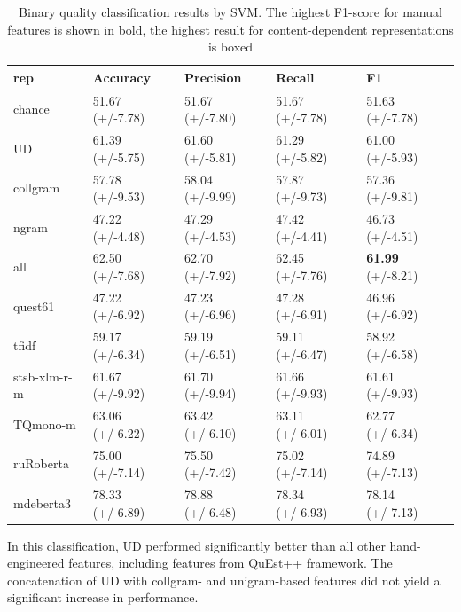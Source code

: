 \begin{table}[H]
	\centering
	\begin{tabular}{l|llll}
		\toprule
		rep      & Accuracy         & Precision        & Recall           & F1               \\
		\midrule
		chance          & 51.67 (+/-7.78) & 51.67 (+/-7.80) & 51.67 (+/-7.78) & 51.63 (+/-7.78) \\
		\midrule
		UD              & 61.39 (+/-5.75) & 61.60 (+/-5.81) & 61.29 (+/-5.82) & 61.00 (+/-5.93) \\
		collgram        & 57.78 (+/-9.53) & 58.04 (+/-9.99) & 57.87 (+/-9.73) & 57.36 (+/-9.81) \\
		ngram           & 47.22 (+/-4.48) & 47.29 (+/-4.53) & 47.42 (+/-4.41) & 46.73 (+/-4.51) \\
		all             & 62.50 (+/-7.68) & 62.70 (+/-7.92) & 62.45 (+/-7.76) & \textbf{61.99} (+/-8.21) \\
		quest61         & 47.22 (+/-6.92) & 47.23 (+/-6.96) & 47.28 (+/-6.91) & 46.96 (+/-6.92) \\
		\midrule
		tfidf           & 59.17 (+/-6.34) & 59.19 (+/-6.51) & 59.11 (+/-6.47) & 58.92 (+/-6.58) \\
		stsb-xlm-r-m          & 61.67 (+/-9.92) & 61.70 (+/-9.94) & 61.66 (+/-9.93) & 61.61 (+/-9.93) \\
		TQmono-m        & 63.06 (+/-6.22) & 63.42 (+/-6.10) & 63.11 (+/-6.01) & 62.77 (+/-6.34) \\
		ruRoberta & 75.00 (+/-7.14) & 75.50 (+/-7.42) & 75.02 (+/-7.14) & 74.89 (+/-7.13) \\
		mdeberta3  & 78.33 (+/-6.89) & 78.88 (+/-6.48) & 78.34 (+/-6.93) & \boxit{0.4in}78.14 (+/-7.13)\\
		\bottomrule
	\end{tabular}
	\caption{\label{tab:bad-good}Binary quality classification results by SVM. The highest F1-score for manual features is shown in bold, the highest result for content-dependent representations is boxed}
\end{table}
In this classification, UD performed significantly better than all other hand-engineered features, including features from QuEst++ framework. The concatenation of UD with collgram- and unigram-based features did not yield a significant increase in performance. 

